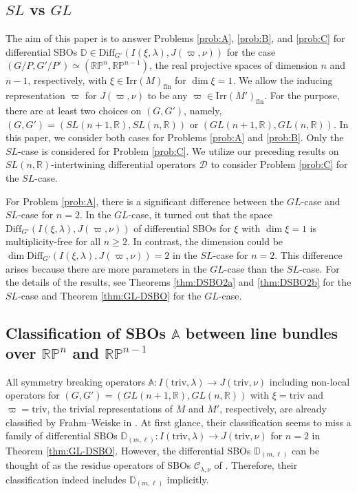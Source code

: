 \documentclass[reqno,11pt]{amsart}
\theoremstyle{remark}
\theoremstyle{definition}
\numberwithin{equation}{section}
\newcommand{\R}{\mathbb{R}}
\newcommand{\Cal}{\mathcal}
\newcommand{\Diff}{\mathrm{Diff}}
\newcommand{\Irr}{\mathrm{Irr}}
\newcommand{\triv}{\mathrm{triv}}
\newcommand{\fin}{\mathrm{fin}}
\newcommand{\RP}{\mathbb{R}\mathbb{P}}
\newcommand{\D}{\Cal{D}}
\newcommand{\bD}{\mathbb{D}}
\newcommand{\bA}{\mathbb{A}}
\begin{document}
\subsection{$SL$ vs $GL$}

The aim of this paper is to answer Problems \ref{prob:A}, 
\ref{prob:B}, and \ref{prob:C} for differential SBOs
$\bD \in \Diff_{G'}(I(\xi, \lambda), J(\varpi, \nu))$
for the case
$(G/P, G'/P')\simeq (\RP^n, \RP^{n-1})$, 
the real projective spaces of dimension
$n$ and $n-1$, respectively, with 
$\xi \in \Irr(M)_{\fin}$ for $\dim \xi =1$.
We allow the inducing representation $\varpi$ for $J(\varpi, \nu)$
 to be any $\varpi \in \Irr(M')_{\fin}$.
For the purpose, there are at least two choices on $(G,G')$, namely,
$(G, G') = (SL(n+1,\R), SL(n,\R))$ or $(GL(n+1,\R), GL(n,\R))$.
In this paper, we consider both cases for Problems \ref{prob:A} and \ref{prob:B}.
Only the $SL$-case is considered for Problem \ref{prob:C}.
We utilize our preceding results on $SL(n,\R)$-intertwining differential operators $\D$
to consider Problem \ref{prob:C} for the $SL$-case.

For Problem \ref{prob:A},  there is a significant difference between
the $GL$-case and $SL$-case for $n=2$. In the $GL$-case, it turned out that the space
$\Diff_{G'}(I(\xi, \lambda), J(\varpi, \nu))$ of differential SBOs for $\xi$ with $\dim \xi =1$
is multiplicity-free for all $n\geq 2$. In contrast, the dimension could be 
$\dim \Diff_{G'}(I(\xi, \lambda), J(\varpi, \nu)) =2$ in the $SL$-case for $n=2$.
This difference arises because there are more parameters in the $GL$-case 
than the $SL$-case. For the details of the results, see Theorems \ref{thm:DSBO2a}
and \ref{thm:DSBO2b} for the $SL$-case and Theorem \ref{thm:GL-DSBO} for the 
$GL$-case.

\subsection{Classification of SBOs $\bA$ between line bundles
over $\RP^n$ and $\RP^{n-1}$}
\label{sec:FW}

All symmetry breaking operators $\bA\colon 
I(\triv, \lambda) \to J(\triv, \nu)$
including non-local operators 
for $(G,G')=(GL(n+1,\R), GL(n,\R))$
with $\xi=\triv$ and $\varpi=\triv$, 
the trivial representations of $M$ and $M'$, respectively,
are already classified by Frahm--Weiske in \cite{FW19}. 
At first glance,
their classification seems to miss a family of differential SBOs
$\bD_{(m,\ell)} \colon
I(\triv, \lambda) \to J(\triv, \nu)$ for $n=2$
in Theorem \ref{thm:GL-DSBO}.
However, the differential SBOs $\bD_{(m,\ell)}$ can be thought of as 
the residue operators of SBOs $\mathcal{C}_{\lambda,\nu}$ of 
\cite[Thm.\ 3.12]{FW19}.
Therefore, their classification indeed includes $\bD_{(m,\ell)}$ implicitly.
\end{document}
